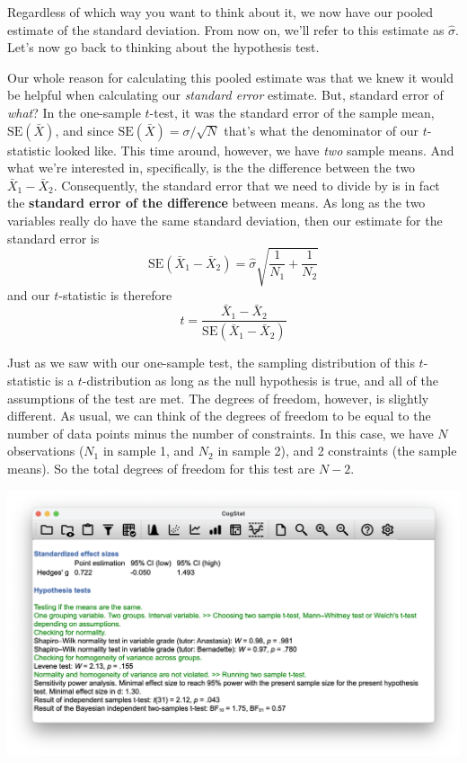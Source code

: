 \documentclass[
  11pt,
  a4paper,
  twoside,symmetric,openright]{book}
\theoremstyle{break}
\theoremstyle{break}
\begin{document}
Regardless of which way you want to think about it, we now have our pooled estimate of the standard deviation. From now on, we'll refer to this estimate as \(\hat\sigma\). Let's now go back to thinking about the hypothesis test.

Our whole reason for calculating this pooled estimate was that we knew it would be helpful when calculating our \emph{standard error} estimate. But, standard error of \emph{what}? In the one-sample \(t\)-test, it was the standard error of the sample mean, \(\mbox{SE}({\bar{X}})\), and since \(\mbox{SE}({\bar{X}}) = \sigma / \sqrt{N}\) that's what the denominator of our \(t\)-statistic looked like. This time around, however, we have \emph{two} sample means. And what we're interested in, specifically, is the the difference between the two \(\bar{X}_1 - \bar{X}_2\). Consequently, the standard error that we need to divide by is in fact the \textbf{standard error of the difference} between means. As long as the two variables really do have the same standard deviation, then our estimate for the standard error is
\[
\mbox{SE}({\bar{X}_1 - \bar{X}_2}) = \hat\sigma \sqrt{\frac{1}{N_1} + \frac{1}{N_2}}
\]
and our \(t\)-statistic is therefore
\[
t = \frac{\bar{X}_1 - \bar{X}_2}{\mbox{SE}({\bar{X}_1 - \bar{X}_2})}
\]

Just as we saw with our one-sample test, the sampling distribution of this \(t\)-statistic is a \(t\)-distribution as long as the null hypothesis is true, and all of the assumptions of the test are met. The degrees of freedom, however, is slightly different. As usual, we can think of the degrees of freedom to be equal to the number of data points minus the number of constraints. In this case, we have \(N\) observations (\(N_1\) in sample 1, and \(N_2\) in sample 2), and 2 constraints (the sample means). So the total degrees of freedom for this test are \(N-2\).

\begin{center}\includegraphics[width=0.6\linewidth]{resources/image/cogstatharpohypo} \end{center}
\end{document}
